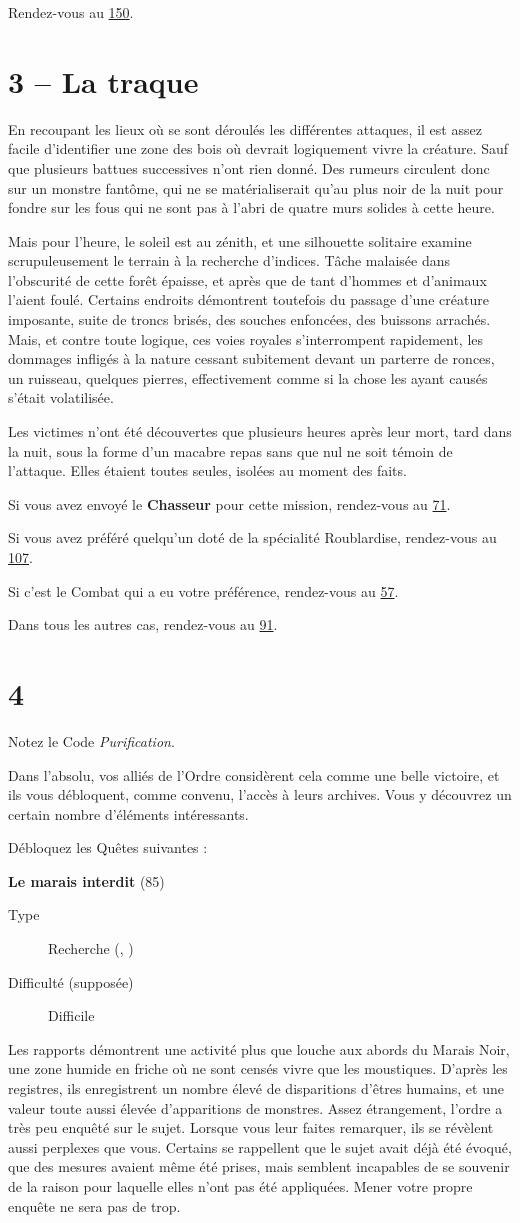 \documentclass{report}
\newcommand{\gsection}[1]{
    \section{#1}
    \label{section-#1}
}
\newcommand{\glink}[1]{\hyperref[section-#1]{#1}}
\newcommand{\quest}[5]{
    \begin{mdframed}[innertopmargin=0.5cm,innerbottommargin=0.5cm]
        \begin{center}
            \textbf{#1} (#2)
        \end{center}
        \begin{description}
            \item[Type] #3
            \item[Difficulté (supposée)] #4
        \end{description}
        #5
    \end{mdframed}
}
\newcommand{\hero}[1]{
    \textbf{#1}
}
\begin{document}
Rendez-vous au \glink{150}.

\gsection{3 – La traque}

En recoupant les lieux où se sont déroulés les différentes attaques, il est assez facile d'identifier une zone des bois où devrait logiquement vivre la créature. Sauf que plusieurs battues successives n'ont rien donné. Des rumeurs circulent donc sur un monstre fantôme, qui ne se matérialiserait qu'au plus noir de la nuit pour fondre sur les fous qui ne sont pas à l'abri de quatre murs solides à cette heure.

Mais pour l'heure, le soleil est au zénith, et une silhouette solitaire examine scrupuleusement le terrain à la recherche d'indices. Tâche malaisée dans l'obscurité de cette forêt épaisse, et après que de tant d'hommes et d'animaux l'aient foulé. Certains endroits démontrent toutefois du passage d'une créature imposante, suite de troncs brisés, des souches enfoncées, des buissons arrachés. Mais, et contre toute logique, ces voies royales s'interrompent rapidement, les dommages infligés à la nature cessant subitement devant un parterre de ronces, un ruisseau, quelques pierres, effectivement comme si la chose les ayant causés s'était volatilisée.

Les victimes n'ont été découvertes que plusieurs heures après leur mort, tard dans la nuit, sous la forme d'un macabre repas sans que nul ne soit témoin de l'attaque. Elles étaient toutes seules, isolées au moment des faits.

Si vous avez envoyé le \hero{Chasseur} pour cette mission, rendez-vous au \glink{71}.

Si vous avez préféré quelqu'un doté de la spécialité Roublardise, rendez-vous au \glink{107}.

Si c'est le Combat qui a eu votre préférence, rendez-vous au \glink{57}.

Dans tous les autres cas, rendez-vous au \glink{91}.

\gsection{4}

Notez le Code \emph{Purification}.

Dans l'absolu, vos alliés de l'Ordre considèrent cela comme une belle victoire, et ils vous débloquent, comme convenu, l'accès à leurs archives. Vous y découvrez un certain nombre d'éléments intéressants.

Débloquez les Quêtes suivantes :

\quest{Le marais interdit}{85}{Recherche (\ankh, \caduceus)}{Difficile}{
Les rapports démontrent une activité plus que louche aux abords du Marais Noir, une zone humide en friche où ne sont censés vivre que les moustiques. D'après les registres, ils enregistrent un nombre élevé de disparitions d'êtres humains, et une valeur toute aussi élevée d'apparitions de monstres. Assez étrangement, l'ordre a très peu enquêté sur le sujet. Lorsque vous leur faites remarquer, ils se révèlent aussi perplexes que vous. Certains se rappellent que le sujet avait déjà été évoqué, que des mesures avaient même été prises, mais semblent incapables de se souvenir de la raison pour laquelle elles n'ont pas été appliquées. Mener votre propre enquête ne sera pas de trop.
}
\end{document}
